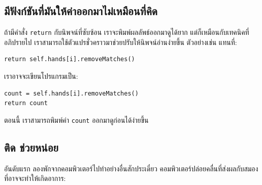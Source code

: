 \subsection{มีฟังก์ชันที่มันให้ค่าออกมาไม่เหมือนที่คิด}


ถ้ามีคำสั่ง \texttt{return} กับนิพจน์ที่ซับซ้อน
เราจะพิมพ์ผลลัพธ์ออกมาดูได้ยาก
แต่ก็เหมือนกับเทคนิคที่อภิปรายไป
เราสามารถใช้ตัวแปรชั่วคราวมาช่วยปรับให้นิพจน์อ่านง่ายขึ้น
ตัวอย่างเช่น
แทนที่:

\begin{verbatim}
return self.hands[i].removeMatches()
\end{verbatim}
%
%
เราอาจจะเขียนโปรแกรมเป็น:

\begin{verbatim}
count = self.hands[i].removeMatches()
return count
\end{verbatim}
%
%
ตอนนี้
เราสามารถพิมพ์ค่า \texttt{count} ออกมาดูก่อนได้ง่ายขึ้น


\subsection{ติด ช่วยหน่อย}


อันดับแรก
ลองพักจากคอมพิวเตอร์ไปทำอย่างอื่นสักประเดี๋ยว
คอมพิวเตอร์ปล่อยคลื่นที่ส่งผลกับสมอง
ที่อาจจะทำให้เกิดอาการ:

